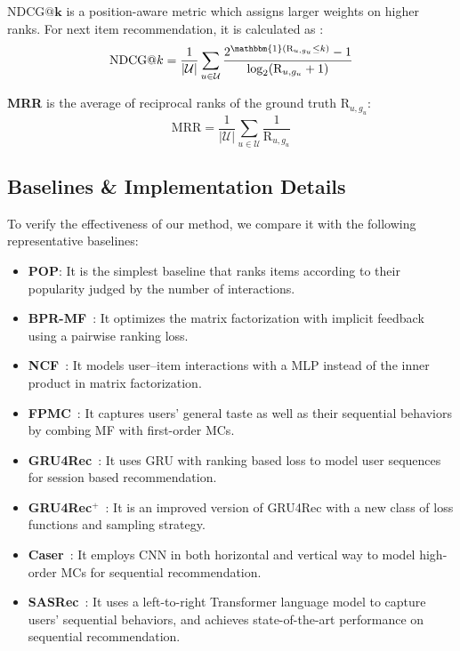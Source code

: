 $\bm{\mathrm{NDCG}@k}$ is a position-aware metric which assigns larger weights on higher ranks. For next item recommendation, it is calculated as :
\begin{equation*}
    \mathrm{NDCG}@k = \frac{1}{\vert \mathcal{U} \vert}\sum_{u \in \mathcal{U}} \frac{2^{\mathbbm{1}(\mathrm{R}_{u, g_u} \leq k)} - 1}{\log_2 (\mathrm{R}_{u, g_u} + 1)}
\end{equation*}

\textbf{MRR} is the average of reciprocal ranks of the ground truth $\mathrm{R}_{u, g_u}$:
\begin{equation*}
    \mathrm{MRR} = \frac{1}{\vert \mathcal{U} \vert}\sum_{u \in \mathcal{U}}\frac{1}{\mathrm{R}_{u, g_u}}
\end{equation*}
\fi


\subsection{Baselines \& Implementation Details}

To verify the effectiveness of our method, we compare it with the following representative baselines:
\begin{itemize}[leftmargin=0.6cm]
    \item \textbf{POP}: It is the simplest baseline that ranks items according to their popularity judged by the number of interactions.
    \item \textbf{BPR-MF}~\cite{Rendle:UAI2009:BBP}: It optimizes the matrix factorization with implicit feedback using a pairwise ranking loss.
    \item \textbf{NCF}~\cite{He:www2017:NCF}: It models user–item interactions with a MLP instead of the inner product in matrix factorization.
    \item \textbf{FPMC}~\cite{Rendle:WWW2010:FPM}: It captures users' general taste as well as their sequential behaviors by combing MF with first-order MCs.
    \item \textbf{GRU4Rec}~\cite{Hidasi:ICLR2016:gru4rec}: It uses GRU with ranking based loss to model user sequences for session based recommendation.
    \item \textbf{GRU4Rec$^{+}$}~\cite{Hidasi:CIKM2018:RNN}: It is an improved version of GRU4Rec with a new class of loss functions and sampling strategy.
    \item \textbf{Caser}~\cite{Tang:WSDM2018:caser}: It employs CNN in both horizontal and vertical way to model high-order MCs for sequential recommendation.
    \item \textbf{SASRec}~\cite{Kang:ICDM2018:SAS}: It uses a left-to-right Transformer language model to capture users' sequential behaviors, and achieves state-of-the-art performance on sequential recommendation.
\end{itemize}


